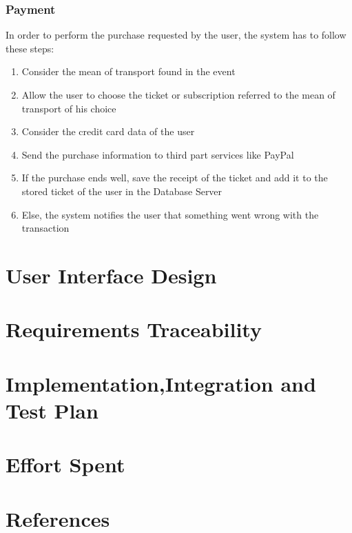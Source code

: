 \documentclass[numbers=noenddot, 12pt, a4paper, oneside]{scrbook}
\begin{document}
\subsection*{Payment}

In order to perform the purchase requested by the user, the system has to follow these steps:

\begin{enumerate}
	\item Consider the mean of transport found in the event
	\item Allow the user to choose the ticket or subscription referred to the mean of transport of his choice
	\item Consider the credit card data of the user
	\item Send the purchase information to third part services like PayPal
	\item If the purchase ends well, save the receipt of the ticket and add it to the stored ticket of the user in the Database Server
	\item Else, the system notifies the user that something went wrong with the transaction
\end{enumerate}


\chapter{User Interface Design}

\chapter{Requirements Traceability}

\chapter{Implementation,Integration and Test Plan}


\chapter{Effort Spent}


\chapter{References}
\end{document}

